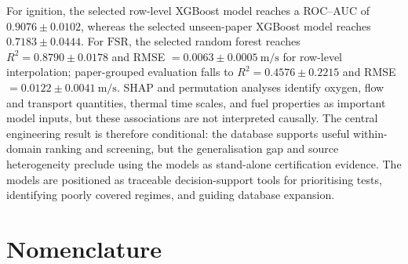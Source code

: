\documentclass[10pt,a4paper,oneside]{report}
\newcommand{\FSR}{\ensuremath{\mathrm{FSR}}}
\begin{document}
For ignition, the selected row-level XGBoost model reaches a
ROC--AUC of \(0.9076\pm0.0102\), whereas the selected unseen-paper XGBoost
model reaches \(0.7183\pm0.0444\). For \FSR{}, the selected random forest
reaches \(R^2=0.8790\pm0.0178\) and
RMSE \(=0.0063\pm0.0005~\si{\metre\per\second}\) for row-level
interpolation; paper-grouped evaluation falls to
\(R^2=0.4576\pm0.2215\) and
RMSE \(=0.0122\pm0.0041~\si{\metre\per\second}\).
SHAP and permutation analyses identify oxygen, flow and transport quantities,
thermal time scales, and fuel properties as important model inputs, but these
associations are not interpreted causally. The central engineering result is
therefore conditional: the database supports useful within-domain ranking and
screening, but the generalisation gap and source heterogeneity preclude using
the models as stand-alone certification evidence. The models are positioned as
traceable decision-support tools for prioritising tests, identifying poorly
covered regimes, and guiding database expansion.

\tableofcontents

\chapter*{Nomenclature}
\end{document}
